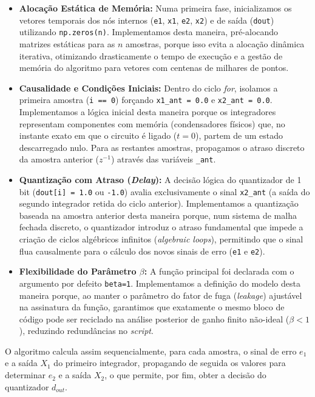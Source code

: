 \begin{itemize}
    \item \textbf{Alocação Estática de Memória:} Numa primeira fase, inicializamos os vetores temporais dos nós internos (\texttt{e1}, \texttt{x1}, \texttt{e2}, \texttt{x2}) e de saída (\texttt{dout}) utilizando \texttt{np.zeros(n)}. Implementamos desta maneira, pré-alocando matrizes estáticas para as $n$ amostras, porque isso evita a alocação dinâmica iterativa, otimizando drasticamente o tempo de execução e a gestão de memória do algoritmo para vetores com centenas de milhares de pontos.
    \vspace{0.2cm}
    \item \textbf{Causalidade e Condições Iniciais:} Dentro do ciclo \textit{for}, isolamos a primeira amostra (\texttt{i == 0}) forçando \texttt{x1\_ant = 0.0} e \texttt{x2\_ant = 0.0}. Implementamos a lógica inicial desta maneira porque os integradores representam componentes com memória (condensadores físicos) que, no instante exato em que o circuito é ligado ($t=0$), partem de um estado descarregado nulo. Para as restantes amostras, propagamos o atraso discreto da amostra anterior ($z^{-1}$) através das variáveis \texttt{\_ant}.
    \vspace{0.2cm}
    \item \textbf{Quantização com Atraso (\textit{Delay}):} A decisão lógica do quantizador de 1 bit (\texttt{dout[i] = 1.0} ou \texttt{-1.0}) avalia exclusivamente o sinal \texttt{x2\_ant} (a saída do segundo integrador retida do ciclo anterior). Implementamos a quantização baseada na amostra anterior desta maneira porque, num sistema de malha fechada discreto, o quantizador introduz o atraso fundamental que impede a criação de ciclos algébricos infinitos (\textit{algebraic loops}), permitindo que o sinal flua causalmente para o cálculo dos novos sinais de erro (\texttt{e1} e \texttt{e2}).
    \vspace{0.2cm}
    \item \textbf{Flexibilidade do Parâmetro $\beta$:} A função principal foi declarada com o argumento por defeito \texttt{beta=1}. Implementamos a definição do modelo desta maneira porque, ao manter o parâmetro do fator de fuga (\textit{leakage}) ajustável na assinatura da função, garantimos que exatamente o mesmo bloco de código pode ser reciclado na análise posterior de ganho finito não-ideal ($\beta < 1$), reduzindo redundâncias no \textit{script}.
\end{itemize}

O algoritmo calcula assim sequencialmente, para cada amostra, o sinal de erro $e_1$ e a saída $X_1$ do primeiro integrador, propagando de seguida os valores para determinar $e_2$ e a saída $X_2$, o que permite, por fim, obter a decisão do quantizador $d_{out}$.

